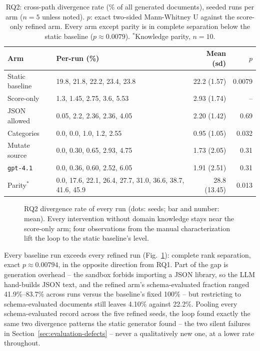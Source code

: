 \begin{table}[t]
\centering
\footnotesize
\caption{RQ2: cross-path divergence rate (\% of all generated documents), seeded runs per arm ($n{=}5$ unless noted). $p$: exact two-sided Mann-Whitney U against the score-only refined arm. Every arm except parity is in complete separation below the static baseline ($p \approx 0.0079$). $^{*}$Knowledge parity, $n{=}10$.}
\label{tab:rq2}
\setlength{\tabcolsep}{3pt}
\begin{tabularx}{\columnwidth}{@{}lXrr@{}}
\toprule
Arm & Per-run (\%) & Mean (sd) & $p$ \\
\midrule
Static baseline & 19.8, 21.8, 22.2, 23.4, 23.8 & 22.2 (1.57) & 0.0079 \\
Score-only & 1.3, 1.45, 2.75, 3.6, 5.53 & 2.93 (1.74) & -- \\
\quad JSON allowed & 0.05, 2.2, 2.36, 2.36, 4.05 & 2.20 (1.42) & 0.69 \\
\quad Categories & 0.0, 0.0, 1.0, 1.2, 2.55 & 0.95 (1.05) & 0.032 \\
\quad Mutate source & 0.0, 0.30, 0.65, 2.93, 4.75 & 1.73 (2.05) & 0.31 \\
\quad \texttt{gpt-4.1} & 0.0, 0.36, 0.60, 2.52, 6.05 & 1.91 (2.51) & 0.31 \\
\quad Parity$^{*}$ & 0.0, 17.6, 22.1, 26.4, 27.7, 31.0, 36.6, 38.7, 41.6, 45.9 & 28.8 (13.45) & 0.013 \\
\bottomrule
\end{tabularx}
\end{table}

\begin{figure}[t]
\centering

\caption{RQ2 divergence rate of every run (dots: seeds; bar and number:
mean). Every intervention without domain knowledge stays near the
score-only arm; four observations from the manual characterization lift
the loop to the static baseline's level.}
\label{fig:rq2-strip}
\end{figure}

Every baseline run exceeds every refined run (Fig.~\ref{fig:rq2-strip}): complete rank separation,
exact $p \approx 0.00794$, in the opposite direction from RQ1. Part of the
gap is generation overhead -- the sandbox forbids importing a JSON library,
so the LLM hand-builds JSON text, and the refined arm's schema-evaluated
fraction ranged 41.9\%--83.7\% across runs versus the baseline's fixed
100\% -- but restricting to schema-evaluated documents still leaves 4.10\%
against 22.2\%. Pooling every schema-evaluated record across the five
refined seeds, the loop found exactly the same two divergence patterns the
static generator found -- the two silent failures in
Section~\ref{sec:evaluation-defects} -- never a qualitatively new one, at a
lower rate throughout.

